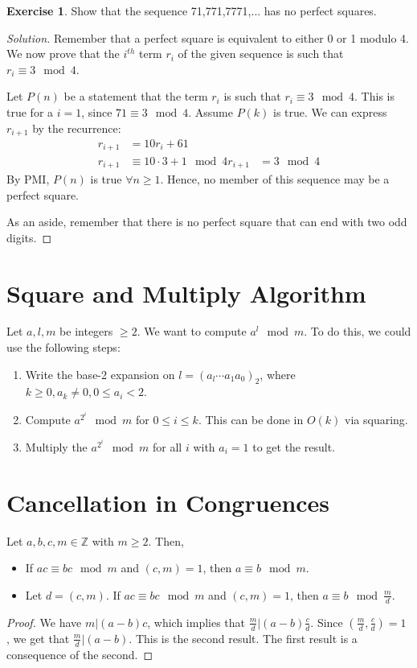 \documentclass[12pt,letterpaper]{amsbook}
\theoremstyle{definition}
\newtheorem*{exercise}{Exercise}
\newenvironment{solution}
  {\renewcommand\qedsymbol{$\blacksquare$}\begin{proof}[Solution]}
  {\end{proof}}
\newcommand{\Z}{\mathbb{Z}}
\begin{document}
\begin{exercise}
  Show that the sequence 71,771,7771,... has no perfect squares. 
\end{exercise}
\begin{solution}
  Remember that a perfect square is equivalent to either 0 or 1 modulo 4. We now prove that the $i^{th}$ term $r_i$ of the given sequence is such that $r_i \equiv 3 \mod 4$. 

  Let $P(n)$ be a statement that the term $r_i$ is such that $r_i \equiv 3 \mod 4$. This is true for a $i = 1$, since $71 \equiv 3 \mod 4$. Assume $P(k)$ is true. We can express $r_{i+1}$ by the recurrence:
  \begin{align*}
    r_{i+1} &= 10r_i + 61 \\
    r_{i+1} & \equiv 10 \cdot 3 + 1 \mod 4
    r_{i+1} &= 3 \mod 4
  \end{align*}
  By PMI, $P(n)$ is true $\forall n \geq 1$. Hence, no member of this sequence may be a perfect square.

  As an aside, remember that there is no perfect square that can end with two odd digits.
\end{solution}

\section{Square and Multiply Algorithm}

Let $a,l,m$ be integers $\geq 2$. We want to compute $a^l \mod m$. To do this, we could use the following steps:

\begin{enumerate}
  \item Write the base-2 expansion on $l = (a_l \cdots a_1 a_0)_2$, where $k \geq 0, a_k \neq 0, 0 \leq a_i < 2$.
  \item Compute $a^{2^i} \mod m$ for $0 \leq i \leq k$. This can be done in $O(k)$ via squaring.
  \item Multiply the $a^{2^i} \mod m$ for all $i$ with $a_i = 1$ to get the result.
\end{enumerate}

\section{Cancellation in Congruences}
\phantom{}
\begin{theorem}
  Let $a,b,c,m \in \Z$ with $m \geq 2$. Then,
  \begin{itemize}
    \item If $ac \equiv bc \mod m$ and $(c,m) = 1$, then $a \equiv b \mod m$.
    \item Let $d = (c,m)$. If $ac \equiv bc \mod m$ and $(c,m) = 1$, then $a \equiv b \mod \frac{m}{d}$.
  \end{itemize}
\end{theorem}
\begin{proof}
  We have $m | (a-b)c$, which implies that $\frac{m}{d} | (a-b) \frac{c}{d}$. Since $(\frac{m}{d},\frac{c}{d})= 1$ , we get that $\frac{m}{d} | (a-b)$. This is the second result. The first result is a consequence of the second.
\end{proof}
\end{document}
